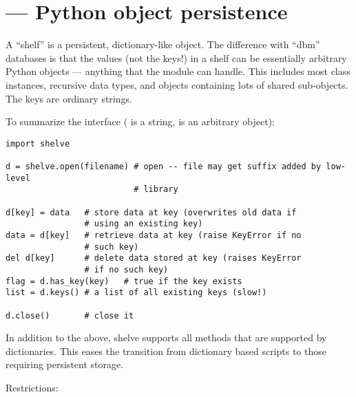 \section{ ---
         Python object persistence}



A ``shelf'' is a persistent, dictionary-like object.  The difference
with ``dbm'' databases is that the values (not the keys!) in a shelf
can be essentially arbitrary Python objects --- anything that the
 module can handle.  This includes most class
instances, recursive data types, and objects containing lots of shared 
sub-objects.  The keys are ordinary strings.

To summarize the interface ( is a string,  is an
arbitrary object):

\begin{verbatim}
import shelve

d = shelve.open(filename) # open -- file may get suffix added by low-level
                          # library

d[key] = data   # store data at key (overwrites old data if
                # using an existing key)
data = d[key]   # retrieve data at key (raise KeyError if no
                # such key)
del d[key]      # delete data stored at key (raises KeyError
                # if no such key)
flag = d.has_key(key)   # true if the key exists
list = d.keys() # a list of all existing keys (slow!)

d.close()       # close it
\end{verbatim}

In addition to the above, shelve supports all methods that are
supported by dictionaries.  This eases the transition from dictionary
based scripts to those requiring persistent storage.

Restrictions:

